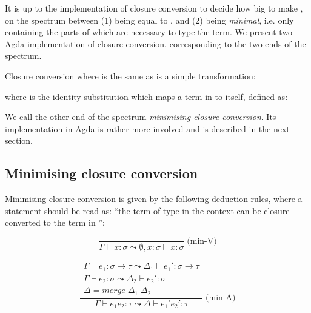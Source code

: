 \documentclass[bsc,frontabs,oneside,singlespacing,parskip,deptreport]{infthesis}
\theoremstyle{definition}
\theoremstyle{lemma}
\begin{document}
It is up to the implementation of closure conversion to decide how big
to make , on the spectrum between (1)  being equal to
, and (2)  being \textit{minimal}, i.e. only containing
the parts of  which are necessary to type the term. We present
two Agda implementation of closure conversion, corresponding to the
two ends of the spectrum.

Closure conversion where  is the same as  is a simple
transformation:


where  is the identity substitution which maps a term
in  to itself, defined as:


We call the other end of the spectrum \textit{minimising closure
  conversion}. Its implementation in Agda is rather more involved and
is described in the next section.

\subsection{Minimising closure conversion}
\label{sec:minim-clos-conv}

Minimising closure conversion is given by the following deduction
rules, where a statement  should be read as:
``the term  of type  in the context  can be closure
converted to the term  in '':

\begin{minipage}{.5\textwidth}
  \[
    \frac
    {}
    {\Gamma \vdash x : \sigma \leadsto \emptyset , x : \sigma \vdash x : \sigma}
    \;\text{(min-V)}
  \]
\end{minipage}%
\begin{minipage}{.5\textwidth}
  \[
    \frac
    {
      \begin{matrix}
        \Gamma \vdash e_1 : \sigma \to \tau \leadsto \Delta_1 \vdash
        e_1' : \sigma \to \tau \\
        \Gamma \vdash e_2 : \sigma \leadsto \Delta_2 \vdash e_2' :
        \sigma \\
        \Delta = merge \; \Delta_1 \; \Delta_2
      \end{matrix}
      }
    {\Gamma ⊢ e_1 e_2 : \tau  \leadsto \Delta  \vdash e_1' e_2' : \tau}
     \;\text{(min-A)}
  \]
\end{minipage}
\end{document}
